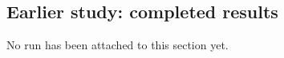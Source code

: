 \subsection{Earlier study: completed results}
\ifdefined\GridInitializationRunPath
\else
No run has been attached to this section yet.
\fi

